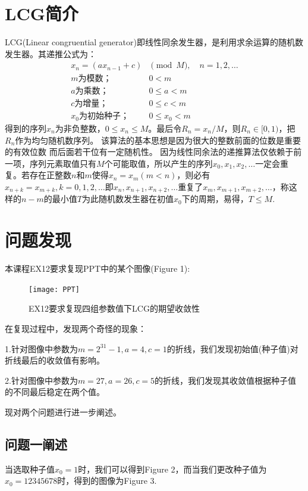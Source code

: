 \documentclass[12pt,a4paper]{article}%
\begin{document}
    \section{LCG简介}
    LCG(Linear congruential generator)即线性同余发生器，是利用求余运算的随机数发生器。其递推公式为：
    \begin{equation}
        \begin{split}
            x_n = (ax_{n-1}+c) & \pmod{M}, \quad n=1,2,\ldots \\
            m\text{为模数；} & 0<m \\
            a\text{为乘数；} & 0\leq a < m \\
            c\text{为增量；} & 0\leq c < m \\
            x_{0}\text{为初始种子；} & 0\leq x_0 <m
        \end{split}\label{eq:equation}
    \end{equation}
    得到的序列${x_n}$为非负整数，$0\leq x_n \leq M$。最后令$R_n=x_n/M$，则$R_n\in [0,1)$，把${R_n}$作为均匀随机数序列。
    该算法的基本思想是因为很大的整数前面的位数是重要的有效位数 而后面若干位有一定随机性。
    因为线性同余法的递推算法仅依赖于前一项，序列元素取值只有$M$个可能取值，所以产生的序列$x_0,x_1,x_2,\ldots$一定会重复。若存在正整数$n$和$m$使得$x_n=x_m(m<n)$，则必有
    $x_{n+k}=x_{m+k},k=0,1,2,\ldots$即$x_n,x_{n+1},x_{n+2},\ldots$重复了$x_m,x_{m+1},x_{m+2},\ldots$，称这样的$n-m$的最小值$T$为此随机数发生器在初值$x_0$下的周期，易得，$T\leq M$.


    \section{问题发现}
    本课程EX12要求复现PPT中的某个图像(Figure 1):

    \begin{figure}[htbp]
        \centering
        \texttt{[image: PPT]}
        \caption{EX12要求复现四组参数值下LCG的期望收敛性}\label{fig:figure}
    \end{figure}

    在复现过程中，发现两个奇怪的现象：

    1.针对图像中参数为$m=2^{31}-1,a=4,c=1$的折线，我们发现初始值(种子值)对折线最后的收敛值有影响。

    2.针对图像中参数为$m=27,a=26,c=5$的折线，我们发现其收敛值根据种子值的不同最后稳定在两个值。

    现对两个问题进行进一步阐述。

    \subsection{问题一阐述}
    当选取种子值$x_0=1$时，我们可以得到Figure 2，而当我们更改种子值为$x_0=12345678$时，得到的图像为Figure 3.
\end{document}
